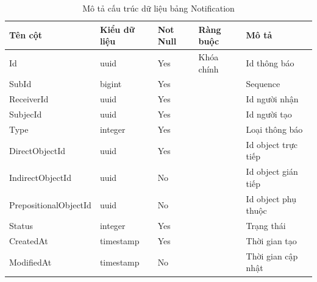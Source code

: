 \documentclass[../index.tex]{subfiles}
\begin{document}
    \begin{table}[H]
        \begin{tabular}{ |p{4cm}|p{2.5cm}|p{1.6cm}|p{2.2cm}|p{3cm}| }
            \hline
            Tên cột               & Kiểu dữ liệu             & Not Null & Ràng buộc  & Mô tả               \\
            \hline
            Id                    & uuid                     & Yes      & Khóa chính & Id thông báo        \\
            \hline
            SubId                 & bigint                   & Yes      &            & Sequence            \\
            \hline
            ReceiverId            & uuid                     & Yes      &            & Id người nhận       \\
            \hline
            SubjecId              & uuid                     & Yes      &            & Id người tạo        \\
            \hline
            Type                  & integer                  & Yes      &            & Loại thông báo      \\
            \hline
            DirectObjectId        & uuid                     & Yes      &            & Id object trực tiếp \\
            \hline
            IndirectObjectId      & uuid                     & No       &            & Id object gián tiếp \\
            \hline
            PrepositionalObjectId & uuid                     & No       &            & Id object phụ thuộc \\
            \hline
            Status                & integer                  & Yes      &            & Trạng thái          \\
            \hline
            CreatedAt             & timestamp & Yes      &            & Thời gian tạo       \\
            \hline
            ModifiedAt            & timestamp & No       &            & Thời gian cập nhật  \\
            \hline
        \end{tabular}
        \caption{Mô tả cấu trúc dữ liệu bảng Notification}
    \end{table}


\end{document}

